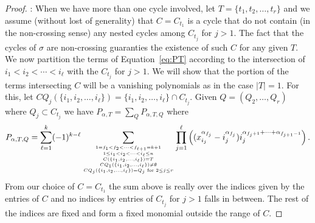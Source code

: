 \documentclass[11pt,oneside]{amsart}
\theoremstyle{definition}
\numberwithin{equation}{section}
\begin{document}
\begin{proof}
\medskip 
{}: 
When we have more than one cycle involved, let $T=\{t_1,t_2,\ldots,t_r\}$ and we assume (without lost of generality) that $C=C_{t_1}$
is a cycle that do not contain (in the non-crossing sense) any nested cycles among $C_{t_j}$ for $j>1$. The fact that the cycles of $\sigma$ are non-crossing guaranties the existence of such $C$
for any given $T$.  We now partition the terms of Equation~\eqref{eq:PT} according to the intersection of $ i_1<i_2<\cdots < i_\ell$ with the $C_{t_j}$ for $j>1$.
We will show that the portion of the terms intersecting $C$ will be a vanishing polynomials as in the case $|T|=1$. 
For this, let $CQ_j(\{i_1,i_2,\ldots,i_\ell\})=\{i_1,i_2,\ldots,i_\ell\}\cap C_{t_j}$.  Given $Q=(Q_2,\ldots,Q_r)$ where $Q_j\subset C_{t_j}$ we have $\displaystyle P_{\alpha,T}=\sum_Q P_{\alpha,T,Q}$ where
\begin{equation}\label{eq:PTQ}
P_{\alpha,T,Q}=
	\sum_{\ell=1}^k (-1)^{k-\ell} \sum_{{{{1=f_1<f_2<\cdots <f_{\ell+1}=k+1  \atop 1\le i_1<i_2<\cdots < i_\ell\le n}\atop C(\{ i_1,i_2,\ldots , i_\ell\})=T}\atop CQ_1(\{ i_1,i_2,\ldots , i_\ell\})\not=\emptyset }
								\atop CQ_j(\{ i_1,i_2,\ldots , i_\ell\})=Q_j \text{ for } 2\le j\le r}
		\prod_{j=1}^\ell 
	     	\Big( (x_{i_j}^{\alpha_{f_j}}- i_j^{\alpha_{f_j }})  i_j^{\alpha_{f_j +1}+\cdots+\alpha_{f_{j +1}-1}} \Big)\,.
\end{equation}
From our choice of $C=C_{t_1}$ the sum above is really over the indices given by the entries of $C$ and no indices by entries of $C_{t_j}$ for $j>1$ falls in between.
The rest of the indices are fixed and form a fixed monomial outside the range of $C$. 


\end{proof}




\vskip 1in
\end{document}
